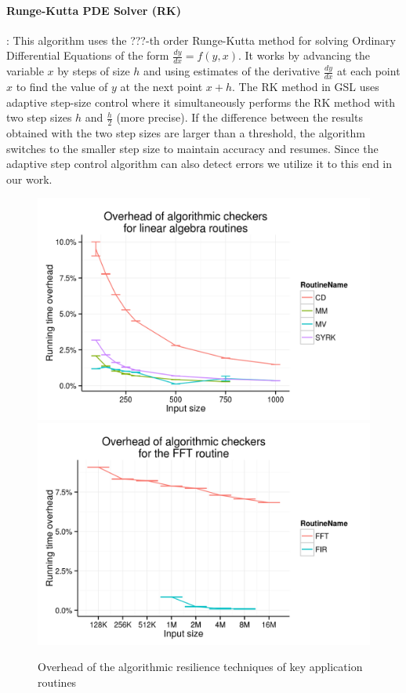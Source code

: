 \documentclass{sig-alternate}
\begin{document}
\paragraph{Runge-Kutta PDE Solver (RK)}:
This algorithm uses the ???-th order Runge-Kutta method for solving Ordinary Differential Equations of the form $\frac{dy}{dx} = f(y, x)$.
It works by advancing the variable $x$ by steps of size $h$ and using estimates of the derivative $\frac{dy}{dx}$ at each point $x$ to find the value of $y$ at the next point $x+h$.
The RK method in GSL uses adaptive step-size control where it simultaneously performs the RK method with two step sizes $h$ and $\frac{h}{2}$ (more precise).
If the difference between the results obtained with the two step sizes are larger than a threshold, the algorithm switches to the smaller step size to maintain accuracy and resumes.
Since the adaptive step control algorithm can also detect errors we utilize it to this end in our work.

\begin{figure}[ht!]
\centering
\includegraphics[width=1.00\columnwidth]{figs/4_1_1_Exp1_linalg}
\includegraphics[width=1.00\columnwidth]{figs/4_1_1_Exp1_fft}
\caption{Overhead of the algorithmic resilience techniques of key application routines}
\label{fig:algo_ovhd}
\end{figure}
\end{document}
